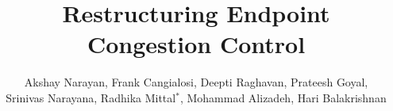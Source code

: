 \documentclass[newfonts=false,format=sigconf,10pt,letterpaper,natbib=false]{acmart}
\begin{document}
\title{Restructuring Endpoint Congestion Control}
\author{
Akshay Narayan,
Frank Cangialosi,
Deepti Raghavan,
Prateesh Goyal,\\
Srinivas Narayana,
Radhika Mittal$^{*}$,
Mohammad Alizadeh,
Hari Balakrishnan
}


\maketitle











\end{document}
